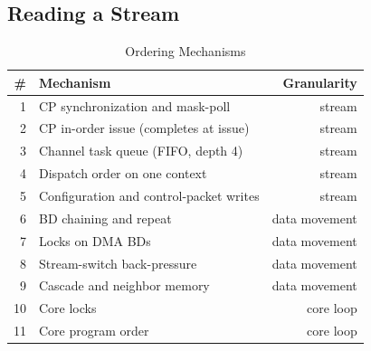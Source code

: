 

\subsection{Reading a Stream}
\label{subsec:reading}

\begin{table}[t]
    \centering
    \caption{Ordering Mechanisms}
    \label{tab:mech}
    \begin{tabular*}{\linewidth}{@{\extracolsep{\fill}}rlr}
        \toprule
        \# & Mechanism & Granularity \\
        \midrule
        1 & CP synchronization and mask-poll & stream \\
        2 & CP in-order issue (completes at issue) & stream \\
        3 & Channel task queue (FIFO, depth 4) & stream \\
        4 & Dispatch order on one context & stream \\
        5 & Configuration and control-packet writes & stream \\
        6 & BD chaining and repeat & data movement \\
        7 & Locks on DMA BDs & data movement \\
        8 & Stream-switch back-pressure & data movement \\
        9 & Cascade and neighbor memory & data movement \\
        10 & Core locks & core loop \\
        11 & Core program order & core loop \\
        \bottomrule
    \end{tabular*}
\end{table}

